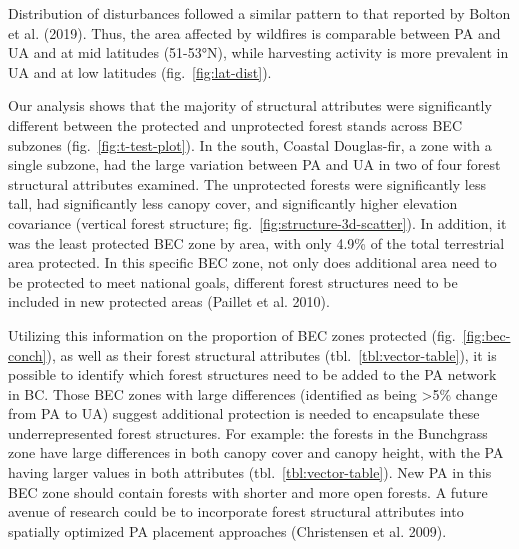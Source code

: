 \documentclass[10pt,oneside]{article}
\begin{document}
Distribution of disturbances followed a similar pattern to that reported
by Bolton et al. (2019). Thus, the area affected by wildfires is
comparable between PA and UA and at mid latitudes (51-53°N), while
harvesting activity is more prevalent in UA and at low latitudes
(fig.~\ref{fig:lat-dist}).

Our analysis shows that the majority of structural attributes were
significantly different between the protected and unprotected forest
stands across BEC subzones (fig.~\ref{fig:t-test-plot}). In the south,
Coastal Douglas-fir, a zone with a single subzone, had the large
variation between PA and UA in two of four forest structural attributes
examined. The unprotected forests were significantly less tall, had
significantly less canopy cover, and significantly higher elevation
covariance (vertical forest structure;
fig.~\ref{fig:structure-3d-scatter}). In addition, it was the least
protected BEC zone by area, with only 4.9\% of the total terrestrial
area protected. In this specific BEC zone, not only does additional area
need to be protected to meet national goals, different forest structures
need to be included in new protected areas (Paillet et al. 2010).

Utilizing this information on the proportion of BEC zones protected
(fig.~\ref{fig:bec-conch}), as well as their forest structural
attributes (tbl.~\ref{tbl:vector-table}), it is possible to identify
which forest structures need to be added to the PA network in BC. Those
BEC zones with large differences (identified as being \textgreater5\%
change from PA to UA) suggest additional protection is needed to
encapsulate these underrepresented forest structures. For example: the
forests in the Bunchgrass zone have large differences in both canopy
cover and canopy height, with the PA having larger values in both
attributes (tbl.~\ref{tbl:vector-table}). New PA in this BEC zone should
contain forests with shorter and more open forests. A future avenue of
research could be to incorporate forest structural attributes into
spatially optimized PA placement approaches (Christensen et al. 2009).
\end{document}
